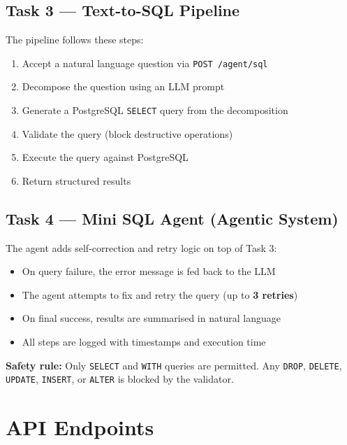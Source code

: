 \documentclass[12pt, a4paper]{article}
\begin{document}
\subsection*{Task 3 — Text-to-SQL Pipeline}
The pipeline follows these steps:

\begin{enumerate}
    \item Accept a natural language question via \texttt{POST /agent/sql}
    \item Decompose the question using an LLM prompt
    \item Generate a PostgreSQL \texttt{SELECT} query from the decomposition
    \item Validate the query (block destructive operations)
    \item Execute the query against PostgreSQL
    \item Return structured results
\end{enumerate}

\subsection*{Task 4 — Mini SQL Agent (Agentic System)}
The agent adds self-correction and retry logic on top of Task 3:

\begin{itemize}
    \item On query failure, the error message is fed back to the LLM
    \item The agent attempts to fix and retry the query (up to \textbf{3 retries})
    \item On final success, results are summarised in natural language
    \item All steps are logged with timestamps and execution time
\end{itemize}

\textbf{Safety rule:} Only \texttt{SELECT} and \texttt{WITH} queries are permitted. Any \texttt{DROP}, \texttt{DELETE}, \texttt{UPDATE}, \texttt{INSERT}, or \texttt{ALTER} is blocked by the validator.

\section{API Endpoints}
\end{document}
